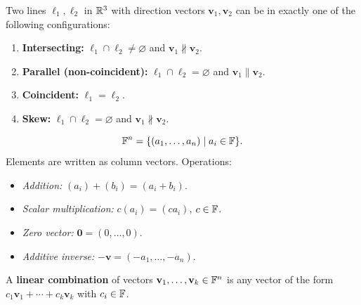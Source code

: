 \begin{defbox}
Two lines $\ell_1,\ell_2$ in $\mathbb{R}^3$ with direction vectors $\mathbf{v}_1,\mathbf{v}_2$
can be in exactly one of the following configurations:
\begin{enumerate}
    \item \textbf{Intersecting:} $\ell_1\cap\ell_2\neq\varnothing$ and
          $\mathbf{v}_1\not\parallel\mathbf{v}_2$.
    \item \textbf{Parallel (non-coincident):} $\ell_1\cap\ell_2=\varnothing$ and
          $\mathbf{v}_1\parallel\mathbf{v}_2$.
    \item \textbf{Coincident:} $\ell_1=\ell_2$.
    \item \textbf{Skew:} $\ell_1\cap\ell_2=\varnothing$ and
          $\mathbf{v}_1\not\parallel\mathbf{v}_2$.
\end{enumerate}
\end{defbox}

\begin{defbox}
\[
    \mathbb{F}^n = \{(a_1,\ldots,a_n)\mid a_i\in\mathbb{F}\}.
\]
Elements are written as column vectors.  Operations:
\begin{itemize}
    \item \emph{Addition:} $(a_i)+(b_i) = (a_i+b_i)$.
    \item \emph{Scalar multiplication:} $c(a_i)=(ca_i)$, $c\in\mathbb{F}$.
    \item \emph{Zero vector:} $\mathbf{0}=(0,\ldots,0)$.
    \item \emph{Additive inverse:} $-\mathbf{v}=(-a_1,\ldots,-a_n)$.
\end{itemize}
A \textbf{linear combination} of vectors $\mathbf{v}_1,\ldots,\mathbf{v}_k\in\mathbb{F}^n$ is
any vector of the form $c_1\mathbf{v}_1+\cdots+c_k\mathbf{v}_k$ with $c_i\in\mathbb{F}$.
\end{defbox}

